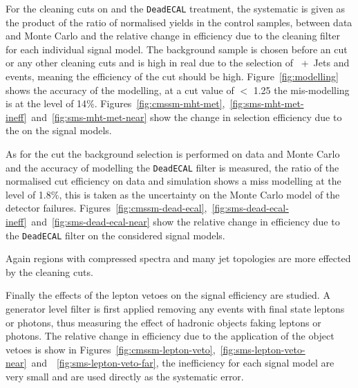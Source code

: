 For the cleaning cuts on \Rmiss and the \texttt{DeadECAL} treatment, the 
systematic is given as the product of the ratio of normalised yields in the 
control samples, between data and Monte Carlo and the relative change in 
efficiency due to the cleaning filter for each individual signal model. The 
background sample is chosen before an \alt cut or any other cleaning cuts and 
is high in real \MET due to the selection of \HepProcess{\PW}~+~Jets and 
\HepProcess{\Ptop\APtop} events, meaning the efficiency of the \Rmiss cut 
should be high. Figure~\ref{fig:modelling} shows the accuracy of the \Rmiss 
modelling, at a cut value of \Rmiss $<$ 1.25 the mis-modelling is at the level 
of 14$\%$. Figures~\ref{fig:cmssm-mht-met},~\ref{fig:sms-mht-met-ineff}~and~\ref{fig:sms-mht-met-near} show the change in selection efficiency due to the \Rmiss on the 
signal models.

As for the \Rmiss cut the background selection is performed on data and 
Monte Carlo and the accuracy of modelling the \texttt{DeadECAL} filter is 
measured, the ratio of the normalised cut efficiency on data and simulation 
shows a miss modelling at the level of 1.8$\%$, this is taken as the 
uncertainty on the Monte Carlo model of the detector failures. 
Figures~\ref{fig:cmssm-dead-ecal},~\ref{fig:sms-dead-ecal-ineff}~and~\ref{fig:sms-dead-ecal-near} show the relative change in efficiency due to the 
\texttt{DeadECAL} filter on the considered signal models.

Again regions with compressed spectra and many jet topologies are more effected 
by the cleaning cuts.

Finally the effects of the lepton vetoes on the signal efficiency are studied. 
A generator level filter is first applied removing any events with final state 
leptons or photons, thus measuring the effect of hadronic objects faking 
leptons or photons. The relative change in efficiency due to the application of 
the object vetoes is show in 
Figures~\ref{fig:cmssm-lepton-veto},~\ref{fig:sms-lepton-veto-near}~and~~\ref{fig:sms-lepton-veto-far}, the inefficiency for each signal model are very small 
and are used directly as the systematic error.


